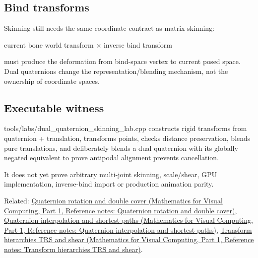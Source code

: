 \subsection{Bind transforms}\label{appendix-921f3f2efb53-bind-transforms}

\hypertarget{appendix-921f3f2efb53-bind-transforms}{}

Skinning still needs the same coordinate contract as matrix skinning:

current bone world transform × inverse bind transform

must produce the deformation from bind-space vertex to current posed space. Dual quaternions change the representation/blending mechanism, not the ownership of coordinate spaces.

\subsection{Executable witness}\label{appendix-921f3f2efb53-executable-witness}

\hypertarget{appendix-921f3f2efb53-executable-witness}{}

tools/labs/dual\_quaternion\_skinning\_lab.cpp constructs rigid transforms from quaternion + translation, transforms points, checks distance preservation, blends pure translations, and deliberately blends a dual quaternion with its globally negated equivalent to prove antipodal alignment prevents cancellation.

It does not yet prove arbitrary multi-joint skinning, scale/shear, GPU implementation, inverse-bind import or production animation parity.

Related: \href{../02-Mathematics-for-Visual-Computing-P01/main.pdf\#appendix-8e61ab68f6b2}{Quaternion rotation and double cover (Mathematics for Visual Computing, Part 1, Reference notes: Quaternion rotation and double cover)}, \href{../02-Mathematics-for-Visual-Computing-P01/main.pdf\#appendix-9b4b8254f26b}{Quaternion interpolation and shortest paths (Mathematics for Visual Computing, Part 1, Reference notes: Quaternion interpolation and shortest paths)}, \href{../02-Mathematics-for-Visual-Computing-P01/main.pdf\#appendix-292c061cd47c}{Transform hierarchies TRS and shear (Mathematics for Visual Computing, Part 1, Reference notes: Transform hierarchies TRS and shear)}.
